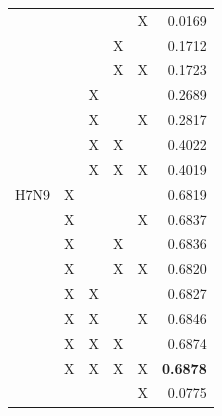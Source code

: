 \begin{longtable}{l|c|c|c|c|r}
\multirow{15}{*}{H7N9}     &           &           &      & X       & 0.0169                           \\ \cline{2-6} 
                           &           &           & X    &         & 0.1712                           \\ \cline{2-6} 
                           &           &           & X    & X       & 0.1723                           \\ \cline{2-6} 
                           &           & X         &      &         & 0.2689                           \\ \cline{2-6} 
                           &           & X         &      & X       & 0.2817                           \\ \cline{2-6} 
                           &           & X         & X    &         & 0.4022                           \\ \cline{2-6} 
                           &           & X         & X    & X       & 0.4019                           \\ \cline{2-6} 
                           & X         &           &      &         & 0.6819                           \\ \cline{2-6} 
                           & X         &           &      & X       & 0.6837                           \\ \cline{2-6} 
                           & X         &           & X    &         & 0.6836                           \\ \cline{2-6} 
                           & X         &           & X    & X       & 0.6820                           \\ \cline{2-6} 
                           & X         & X         &      &         & 0.6827                           \\ \cline{2-6} 
                           & X         & X         &      & X       & 0.6846                           \\ \cline{2-6} 
                           & X         & X         & X    &         & 0.6874                           \\ \cline{2-6} 
                           & X         & X         & X    & X       & \textbf{0.6878}                           \\ \hline \pagebreak 
\multirow{17}{*}{Autism}   &           &           &      & X       & 0.0775                           \\ \cline{2-6} 

\end{longtable}

